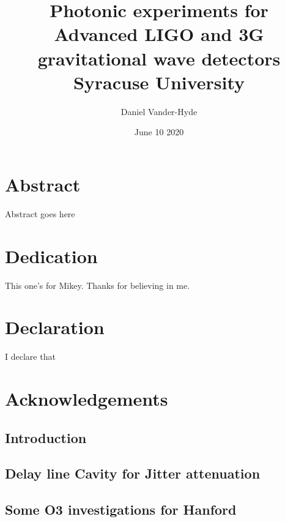 \documentclass[12pt]{report}
\title{
{Photonic experiments for Advanced LIGO and 3G gravitational wave detectors}\\
{\large Syracuse University}\\
}
\author{Daniel Vander-Hyde}
\date{June 10 2020}
\begin{document}
\maketitle

\chapter*{Abstract}
Abstract goes here

\chapter*{Dedication}
This one's for Mikey. Thanks for believing in me.

\chapter*{Declaration}
I declare that

\chapter*{Acknowledgements}


\tableofcontents

\maketitle

\section{Introduction}

\newpage

\section{Delay line Cavity for Jitter attenuation}

\newpage

\section{Some O3 investigations for Hanford}

\end{document}
